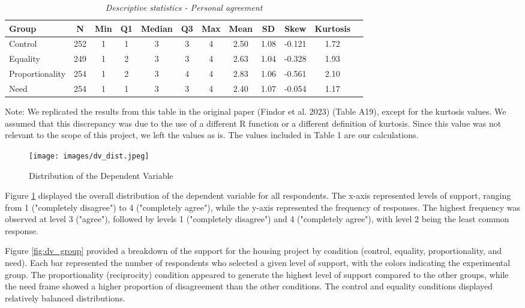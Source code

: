 \documentclass[titlepage]{article}
\begin{document}
\begin{table}[H]
    \centering
    \caption{\textit{Descriptive statistics - Personal agreement}}
    \begin{tabular}{lccccccccccc}  
        \toprule
        \textbf{Group} & \textbf{N} & \textbf{Min} & \textbf{Q1} & \textbf{Median} & \textbf{Q3} & \textbf{Max} & \textbf{Mean} & \textbf{SD} & \textbf{Skew} & \textbf{Kurtosis} \\
        \midrule
        Control        & 252 & 1 & 1 & 3 & 3 & 4 & 2.50 & 1.08 & -0.121 & 1.72 \\
        Equality       & 249 & 1 & 2 & 3 & 3 & 4 & 2.63 & 1.04 & -0.328 & 1.93 \\
        Proportionality & 254 & 1 & 2 & 3 & 4 & 4 & 2.83 & 1.06 & -0.561 & 2.10 \\
        Need          & 254 & 1 & 1 & 3 & 3 & 4 & 2.40 & 1.07 & -0.054 & 1.17 \\
        \bottomrule
    \end{tabular}
\end{table}

\justify
Note: We replicated the results from this table in the original paper (Findor et al. 2023) (Table A19), except for the kurtosis values. We assumed that this discrepancy was due to the use of a different R function or a different definition of kurtosis. Since this value was not relevant to the scope of this project, we left the values as is. The values included in Table 1 are our calculations.

\begin{figure}[H]
    \centering
    \texttt{[image: images/dv\_dist.jpeg]}
    \caption{Distribution of the Dependent Variable}
    \label{fig:dv}
\end{figure}

\justify
Figure \ref{fig:dv} displayed the overall distribution of the dependent variable for all respondents. The x-axis represented levels of support, ranging from 1 ("completely disagree") to 4 ("completely agree"), while the y-axis represented the frequency of responses. The highest frequency was observed at level 3 ("agree"), followed by levels 1 ("completely disagree") and 4 ("completely agree"), with level 2 being the least common response.

\justify
Figure \ref{fig:dv_group} provided a breakdown of the support for the housing project by condition (control, equality, proportionality, and need). Each bar represented the number of respondents who selected a given level of support, with the colors indicating the experimental group. The proportionality (reciprocity) condition appeared to generate the highest level of support compared to the other groups, while the need frame showed a higher proportion of disagreement than the other conditions. The control and equality conditions displayed relatively balanced distributions.
\end{document}
